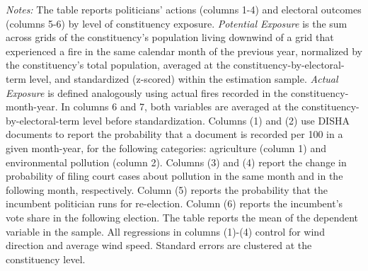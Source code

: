 \documentclass[12pt]{article}
\let\SourceInput
\renewcommand{}[1]{%
  \IfFileExists{../../#1}{\SourceInput{../../#1}}{%
    \IfFileExists{../../#1.tex}{\SourceInput{../../#1.tex}}{%
      \fbox{\scriptsize Missing table: \detokenize{#1}}}}}
\begin{document}
\begin{table}[htbp!] 
\caption{Pollution Exposure, Politicians' Actions, and Electoral Consequences, Any Fire $\times$ Downwind Population}\label{tab:mechanism}
        \resizebox{\linewidth}{!}{
        
        }
    \begin{minipage}{\textwidth}
        {\footnotesize \textit{Notes:} The table reports politicians' actions (columns 1-4) and electoral outcomes (columns 5-6) by level of constituency exposure.
        \textit{Potential Exposure} is the sum across  grids of the constituency's population living downwind of a grid that experienced a fire in the same calendar month of the previous year, normalized by the constituency's total population, averaged at the constituency-by-electoral-term level, and standardized (z-scored) within the estimation sample.
        \textit{Actual Exposure} is defined analogously using actual fires recorded in the   constituency-month-year. In columns 6 and 7, both variables are averaged at  the constituency-by-electoral-term level before standardization.
        Columns (1) and (2) use DISHA documents to report the probability that a document is recorded per 100 in a given month-year, for the following categories: agriculture (column 1) and environmental pollution (column 2). Columns (3) and (4) report the change in probability of filing court cases about pollution in the same month and in the following month, respectively. Column (5) reports the probability that the incumbent politician runs for re-election. Column (6) reports the incumbent's vote share in the following election.
        The table reports the mean of the dependent variable in the sample. All regressions in columns (1)-(4) control for wind direction and average wind speed. Standard errors are clustered at the constituency level.
        }
    \end{minipage}
\end{table}
\end{document}

